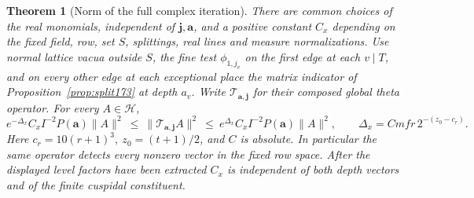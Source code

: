 \documentclass[a4paper,11pt]{article}
\newtheorem{theorem}[proposition]{Theorem}
\theoremstyle{definition}
\theoremstyle{remark}
\numberwithin{equation}{section}
\begin{document}
\begin{theorem}[Norm of the full complex iteration]
\label{thm:norm177}
There are common choices of the real monomials, independent
of \(\mathbf j,\mathbf a\), and a positive constant \(C_x\)
depending on the fixed field, row, set \(S\), splittings,
real lines and measure normalizations. Use normal lattice
vacua outside \(S\), the fine test \(\phi_{1,j_v}\) on the
first edge at each \(v\mid T\), and on every other edge at
each exceptional place the matrix indicator of
Proposition~\ref{prop:split173} at depth \(a_v\). Write
\(\mathcal T_{\mathbf a,\mathbf j}\) for their composed
global theta operator. For every \(A\in\mathcal H\),
\begin{equation}
 e^{-\Delta_x} C_x I^{-2}P(\mathbf a)\|A\|^2
 \ \le\ \|\mathcal T_{\mathbf a,\mathbf j}A\|^2
 \ \le\ e^{\Delta_x} C_x I^{-2}P(\mathbf a)\|A\|^2,
 \qquad
 \Delta_x=Cmfr\,2^{-(z_0-c_r)}.                       \label{eq:common177}
\end{equation}
Here \(c_r=10(r+1)^3,\ z_0=(t+1)/2\), and \(C\) is
absolute. In particular the same operator detects every
nonzero vector in the fixed row space. After the displayed
level factors have been extracted \(C_x\) is independent
of both depth vectors and of the finite cuspidal constituent.
\end{theorem}
\end{document}
